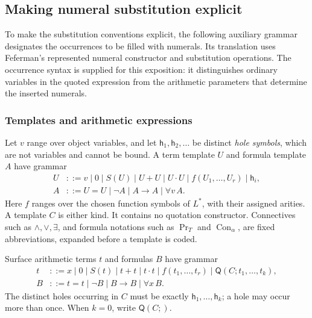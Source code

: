 \documentclass[11pt]{article}
\newcommand{\Prov}{\operatorname{Pr}}
\newcommand{\Con}{\operatorname{Con}}
\newcommand{\Q}{\mathsf Q}
\newcommand{\h}{\mathsf h}
\theoremstyle{definition}
\begin{document}
\subsection{Making numeral substitution explicit}

To make the substitution conventions explicit, the following auxiliary
grammar designates the occurrences to be filled with numerals. Its
translation uses Feferman's represented numeral constructor and
substitution operations. The occurrence syntax is supplied for this
exposition: it distinguishes ordinary variables in the quoted expression
from the arithmetic parameters that determine the inserted numerals.

\subsubsection*{Templates and arithmetic expressions}
Let $v$ range over object variables, and let
$\h_1,\h_2,\ldots$ be distinct \emph{hole symbols}, which are not
variables and cannot be bound. A term template $U$ and formula template
$A$ have grammar
\begin{align*}
 U&::=v\mid0\mid S(U)\mid U+U\mid U\cdot U
        \mid f(U_1,\ldots,U_r)\mid\h_i,\\
 A&::=U=U\mid\neg A\mid A\to A\mid\forall v\,A.
\end{align*}
Here $f$ ranges over the chosen function symbols of $L^{*}$, with
their assigned arities. A template $C$ is either kind. It contains no
quotation constructor. Connectives such as $\land,\lor,\exists$, and
formula notations such as $\Prov_T$ and $\Con_\alpha$, are fixed
abbreviations, expanded before a template is coded.

Surface arithmetic terms $t$ and formulas $B$ have grammar
\begin{align*}
 t&::=x\mid0\mid S(t)\mid t+t\mid t\cdot t
       \mid f(t_1,\ldots,t_r)\mid\Q(C;t_1,\ldots,t_k),\\
 B&::=t=t\mid\neg B\mid B\to B\mid\forall x\,B.
\end{align*}
The distinct holes occurring in $C$ must be exactly
$\h_1,\ldots,\h_k$; a hole may occur more than once. When $k=0$,
write $\Q(C;)$.
\end{document}
